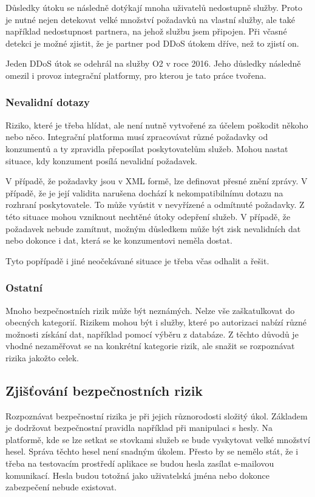 \documentclass[thesis=M,czech]{FITthesis}[2012/10/20]
\begin{document}
				Důsledky útoku se následně dotýkají mnoha uživatelů nedostupně služby. Proto je nutné nejen detekovat velké množství požadavků na vlastní služby, ale také například nedostupnost partnera, na jehož službu jsem připojen. Při včasné detekci je možné zjistit, že je partner pod DDoS útokem dříve, než to zjistí on. 
				
			    Jeden DDoS útok se odehrál na služby O2 v roce 2016. Jeho důsledky následně omezil i provoz integrační platformy, pro kterou je tato práce tvořena. 
			
			\subsubsection{Nevalidní dotazy}
				Riziko, které je třeba hlídat, ale není nutně vytvořené za účelem poškodit někoho nebo něco. Integrační platforma musí zpracovávat různé požadavky od konzumentů a ty zpravidla přeposílat poskytovatelům služeb. Mohou nastat situace, kdy konzument posílá nevalidní požadavek.
			
				V případě, že požadavky jsou v XML formě, lze definovat přesné znění zprávy. V případě, že je její validita narušena dochází k nekompatibilnímu dotazu na rozhraní poskytovatele. To může vyústit v nevyřízené a odmítnuté požadavky. Z této situace mohou vzniknout nechtěné útoky odepření služeb. V případě, že požadavek nebude zamítnut, možným důsledkem může být zisk nevalidních dat nebo dokonce i dat, která se ke konzumentovi neměla dostat.
			
				Tyto popřípadě i jiné neočekávané situace je třeba včas odhalit a řešit.
				
			\subsubsection{Ostatní}
				Mnoho bezpečnostních rizik může být neznámých. Nelze vše zaškatulkovat do obecných kategorií. Rizikem mohou být i služby, které po autorizaci nabízí různé možnosti získání dat, například pomocí výběru z databáze. Z těchto důvodů je vhodné nezaměřovat se na konkrétní kategorie rizik, ale snažit se rozpoznávat rizika jakožto celek.	
			
		\subsection{Zjišťování bezpečnostních rizik}
			Rozpoznávat bezpečnostní rizika je při jejich různorodosti složitý úkol. Základem je dodržovat bezpečnostní pravidla například při manipulaci s hesly. Na platformě, kde se lze setkat se stovkami služeb se bude vyskytovat velké množství hesel. Správa těchto hesel není snadným úkolem. Přesto by se nemělo stát, že i třeba na testovacím prostředí aplikace se budou hesla zasílat e-mailovou komunikací. Hesla budou totožná jako uživatelská jména nebo dokonce zabezpečení nebude existovat. 
			
\end{document}

